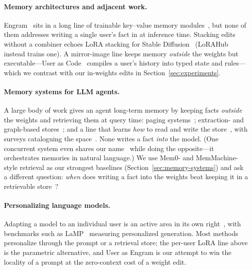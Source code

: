 \documentclass[11pt]{article}
\begin{document}
\paragraph{Memory architectures and adjacent work.}
Engram~\citep{cheng2026engram} sits in a long line of trainable
key--value memory modules~\citep{geva2021kv,lample2019pkm,he2024peer,berges2025memory,ultramem2025,overencoding2025,scone2025,pagnoni2025blt,superbpe2025},
but none of them addresses writing a single user's fact in at
inference time. Stacking edits without a combiner echoes LoRA
stacking for Stable Diffusion~\citep{lora_diffusion}
(LoRAHub~\citep{huang2023lorahub} instead trains one). A mirror-image
line keeps memory \emph{outside} the weights but executable---User as
Code~\citep{li2026userascode} compiles a user's history into typed
state and rules---which we contrast with our in-weights edits in
Section~\ref{sec:experiments}.

\paragraph{Memory systems for LLM agents.}
A large body of work gives an agent long-term memory by keeping
facts \emph{outside} the weights and retrieving them at query
time: paging systems~\citep{packer2023memgpt}; extraction- and
graph-based stores~\citep{chhikara2025mem0,xu2025amem,rasmussen2025zep,li2025memos,hu2026evermemos,wang2026memmachine};
and a line that learns \emph{how} to read and write the
store~\citep{yan2025memoryr1,yu2026agemem,wang2025memalpha}, with
surveys cataloguing the
space~\citep{zhang2024memorysurvey,wu2025humantoai,du2026memorysurvey}.
None writes a fact \emph{into} the model. (One concurrent system
even shares our name~\citep{patel2025engram} while doing the
opposite---it orchestrates memories in natural language.) We use
Mem0- and MemMachine-style retrieval as our strongest baselines
(Section~\ref{sec:memory-systems}) and ask a different question:
\emph{when} does writing a fact into the weights beat keeping it in
a retrievable store~\citep{pollertlam2026beyondcontext}?

\paragraph{Personalizing language models.} Adapting a model to an
individual user is an active area in its own
right~\citep{zhang2024personalization,liu2025personalizedllm,xu2026personalizedagents},
with benchmarks such as LaMP~\citep{salemi2024lamp} measuring
personalized generation. Most methods personalize through the
prompt or a retrieval store; the per-user LoRA line above is the
parametric alternative, and User as Engram is our attempt to win
the locality of a prompt at the zero-context cost of a weight
edit.
\end{document}
